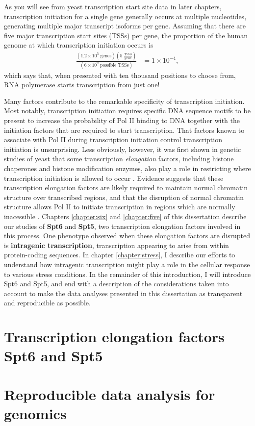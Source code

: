 As you will see from yeast transcription start site data in later chapters, transcription initiation for a single gene generally occurs at multiple nucleotides, generating multiple major transcript isoforms per gene.
Assuming that there are five major transcription start sites (TSSs) per gene, the proportion of the human genome at which transcription initiation occurs is
\begin{align*}
    \frac{\left(1.2 \times 10^5 \; \text{genes}\right) \left(5 \; \frac{\text{TSSs}}{\text{gene}} \right)}
         {\left(6 \times 10^9 \; \text{possible TSSs} \right)}
    &= 1 \times 10^{-4},
\end{align*}
which says that, when presented with ten thousand positions to choose from, RNA polymerase starts transcription from just one!

Many factors contribute to the remarkable specificity of transcription initiation.
Most notably, transcription initiation requires specific DNA sequence motifs to be present to increase the probability of Pol II binding to DNA together with the initiation factors that are required to start transcription.
That factors known to associate with Pol II during transcription initiation control transcription initiation is unsurprising.
Less obviously, however, it was first shown in genetic studies of yeast that some transcription \textit{elongation} factors, including histone chaperones and histone modification enzymes, also play a role in restricting where transcription initiation is allowed to occur \citep{kaplan2003, cheung2008, hennig2013}.
Evidence suggests that these transcription elongation factors are likely required to maintain normal chromatin structure over transcribed regions, and that the disruption of normal chromatin structure allows Pol II to initiate transcription in regions which are normally inacessible \citep{}.
Chapters \ref{chapter:six} and \ref{chapter:five} of this dissertation describe our studies of \textbf{Spt6} and \textbf{Spt5}, two transcription elongation factors involved in this process.
One phenotype observed when these elongation factors are disrupted is \textbf{intragenic transcription}, transcription appearing to arise from within protein-coding sequences.
In chapter \ref{chapter:stress}, I describe our efforts to understand how intragenic transcription might play a role in the cellular response to various stress conditions.
In the remainder of this introduction, I will introduce Spt6 and Spt5, and end with a description of the considerations taken into account to make the data analyses presented in this dissertation as transparent and reproducible as possible.

\section{Transcription elongation factors Spt6 and Spt5}

\lipsum[1]

\section{Reproducible data analysis for genomics}

\lipsum[1]

